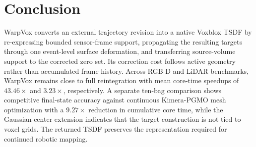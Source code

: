\section{Conclusion}
WarpVox converts an external trajectory revision into a native Voxblox TSDF by
re-expressing bounded sensor-frame support, propagating the resulting targets
through one event-level surface deformation, and transferring source-volume
support to the corrected zero set. Its correction cost follows active geometry
rather than accumulated frame history. Across RGB-D and LiDAR benchmarks,
WarpVox remains close to full reintegration with mean core-time speedups of
$43.46\times$ and $3.23\times$, respectively. A separate ten-bag comparison
shows competitive final-state accuracy against continuous Kimera-PGMO mesh
optimization with a $9.27\times$ reduction in cumulative core time, while the
Gaussian-center extension indicates that the target construction is not tied
to voxel grids. The returned TSDF preserves the representation required for
continued robotic mapping.
